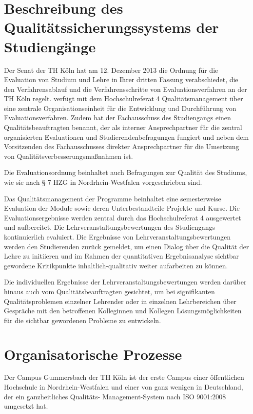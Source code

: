 \section{Beschreibung des Qualitätssicherungssystems der
Studiengänge}\label{beschreibung-des-qualituxe4tssicherungssystems-der-studienguxe4nge}

Der Senat der TH Köln hat am 12. Dezember 2013 die Ordnung für die
Evaluation von Studium und Lehre in Ihrer dritten Fassung verabschiedet,
die den Verfahrensablauf und die Verfahrensschritte von
Evaluationsverfahren an der TH Köln regelt. verfügt mit dem
Hochschulreferat 4 Qualitätsmanagement über eine zentrale
Organisationseinheit für die Entwicklung und Durchführung von
Evaluationsverfahren. Zudem hat der Fachausschuss des Studiengangs einen
Qualitätsbeauftragten benannt, der als interner Ansprechpartner für die
zentral organisierten Evaluationen und Studierendenbefragungen fungiert
und neben dem Vorsitzenden des Fachausschusses direkter Ansprechpartner
für die Umsetzung von Qualitätsverbesserungsmaßnahmen ist.

Die Evaluationsordnung beinhaltet auch Befragungen zur Qualität des
Studiums, wie sie nach § 7 HZG in Nordrhein-Westfalen vorgeschrieben
sind.

Das Qualitätsmanagement der Programme beinhaltet eine semesterweise
Evaluation der Module sowie deren Unterbestandteile Projekte und Kurse.
Die Evaluationsergebnisse werden zentral durch das Hochschulreferat 4
ausgewertet und aufbereitet. Die Lehrveranstaltungsbewertungen des
Studiengangs kontinuierlich evaluiert. Die Ergebnisse von
Lehrveranstaltungsbewertungen werden den Studierenden zurück gemeldet,
um einen Dialog über die Qualität der Lehre zu initiieren und im Rahmen
der quantitativen Ergebnisanalyse sichtbar gewordene Kritikpunkte
inhaltlich-qualitativ weiter aufarbeiten zu können.

Die individuellen Ergebnisse der Lehrveranstaltungsbewertungen werden
darüber hinaus auch vom Qualitätsbeauftragten gesichtet, um bei
signifikanten Qualitätsproblemen einzelner Lehrender oder in einzelnen
Lehrbereichen über Gespräche mit den betroffenen Kolleginnen und
Kollegen Lösungsmöglichkeiten für die sichtbar gewordenen Probleme zu
entwickeln.

\section{Organisatorische Prozesse}\label{organisatorische-prozesse}

Der Campus Gummersbach der TH Köln ist der erste Campus einer
öffentlichen Hochschule in Nordrhein-Westfalen und einer von ganz
wenigen in Deutschland, der ein ganzheitliches Qualitäts-
Management-System nach ISO 9001:2008 umgesetzt hat.

